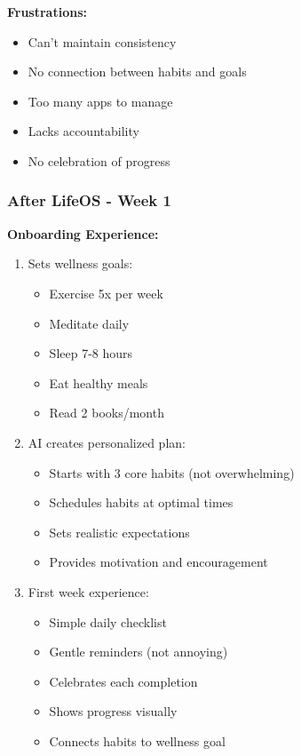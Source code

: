 \textbf{Frustrations:}
\begin{itemize}
    \item Can't maintain consistency
    \item No connection between habits and goals
    \item Too many apps to manage
    \item Lacks accountability
    \item No celebration of progress
\end{itemize}

\subsubsection{After LifeOS - Week 1}

\textbf{Onboarding Experience:}
\begin{enumerate}
    \item Sets wellness goals:
    \begin{itemize}
        \item Exercise 5x per week
        \item Meditate daily
        \item Sleep 7-8 hours
        \item Eat healthy meals
        \item Read 2 books/month
    \end{itemize}
    
    \item AI creates personalized plan:
    \begin{itemize}
        \item Starts with 3 core habits (not overwhelming)
        \item Schedules habits at optimal times
        \item Sets realistic expectations
        \item Provides motivation and encouragement
    \end{itemize}
    
    \item First week experience:
    \begin{itemize}
        \item Simple daily checklist
        \item Gentle reminders (not annoying)
        \item Celebrates each completion
        \item Shows progress visually
        \item Connects habits to wellness goal
    \end{itemize}
\end{enumerate}

